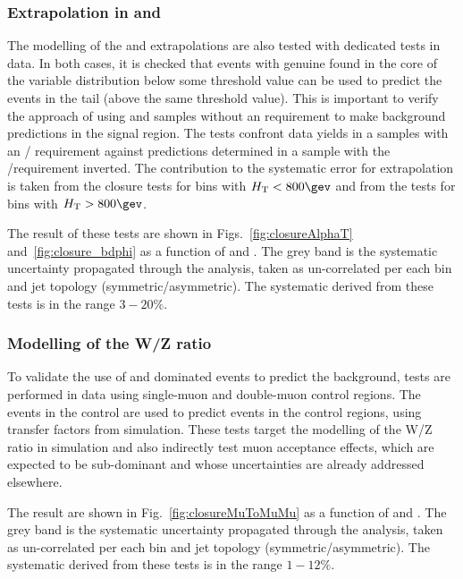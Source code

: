\subsubsection*{Extrapolation in \alphat and \bdphi}
\label{sec:tfSyst_alphaT}
The modelling of the \alphat and
\bdphi extrapolations are also tested with dedicated tests in data. 
In both cases, it is checked that events with genuine \met found in the core
of the variable distribution below some threshold value can be used to
predict the events in the tail (above the same threshold value).
This is important to verify the
approach of using \mj and \mmj samples without an \alphat requirement
to make background predictions in the signal region. The tests
confront data yields in a \mj  samples with an \alphat /\bdphi
requirement against predictions determined in a \mj sample with
the \alphat /\bdphi requirement inverted. 
The contribution to the systematic error for \met extrapolation is taken
from the \alphat closure tests for bins with $\scalht<800\gev$ and from 
the \bdphi tests for bins with $\scalht>800\gev$. 

The result of these tests are shown in Figs.~\ref{fig:closureAlphaT}
and~\ref{fig:closure_bdphi} as a function of \scalht and \njet. 
The grey band is the systematic uncertainty propagated through the analysis, 
taken as un-correlated per each \scalht bin and jet topology
(symmetric/asymmetric). The systematic derived from these tests is
in the range $3-20\%$.

\subsubsection*{Modelling of the W/Z ratio}
\label{sec:tfSyst_WZratio}
To validate the use of \wmj and \ttbar dominated \mj events to predict the \znunu
background, tests are performed in data using single-muon and double-muon control regions. 
The events in the \mj control are used to predict events in the \mmj control regions, 
using transfer factors from simulation. 
These tests target the modelling of the W/Z ratio in simulation and 
also indirectly test muon acceptance effects, which 
are expected to be sub-dominant and whose uncertainties are already addressed elsewhere.

The result are shown in Fig.~\ref{fig:closureMuToMuMu} as a function of \scalht and \njet. 
The grey band is the systematic uncertainty propagated through the analysis, 
taken as un-correlated per each \scalht bin and jet topology (symmetric/asymmetric). The systematic derived from these tests is
in the range $1-12\%$.

